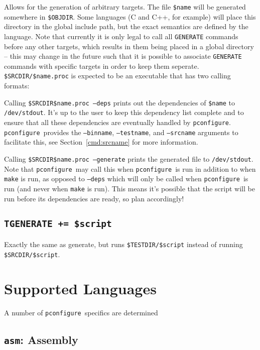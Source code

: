 \documentclass{article}
\newcommand{\pconfigure}{\texttt{pconfigure}}
\begin{document}
Allows for the generation of arbitrary targets.  The file
\texttt{\$name} will be generated somewhere in \texttt{\$OBJDIR}.
Some languages (C and C++, for example) will place this directory in
the global include path, but the exact semantics are defined by the
language.  Note that currently it is only legal to call all
\texttt{GENERATE} commands before any other targets, which results in
them being placed in a global directory -- this may change in the
future such that it is possible to associate \texttt{GENERATE}
commands with specific targets in order to keep them seperate.
\texttt{\$SRCDIR/\$name.proc} is expected to be an executable that has
two calling formats:

Calling \texttt{\$SRCDIR\$name.proc --deps} prints out the
dependencies of \texttt{\$name} to \texttt{/dev/stdout}.  It's up to
the user to keep this dependency list complete and to ensure that all
these dependencies are eventually handled by \pconfigure.
\pconfigure\ provides the \texttt{--binname}, \texttt{--testname}, and
\texttt{--srcname} arguments to facilitate this, see
Section~\ref{cmd:srcname} for more information.

Calling \texttt{\$SRCDIR\$name.proc --generate} prints the generated
file to \texttt{/dev/stdout}.  Note that \pconfigure\ may call this
when \pconfigure\ is run in addition to when \texttt{make} is run, as
opposed to \texttt{--deps} which will only be called when
\pconfigure\ is run (and never when \texttt{make} is run).  This means
it's possible that the script will be run before its dependencies are
ready, so plan accordingly!

\subsection{\texttt{TGENERATE += \$script}}

Exactly the same as generate, but runs \texttt{\$TESTDIR/\$script}
instead of running \texttt{\$SRCDIR/\$script}.

\section{Supported Languages \label{lang}}

A number of \pconfigure\ specifics are determined

\subsection{\texttt{asm}: Assembly}
\end{document}
